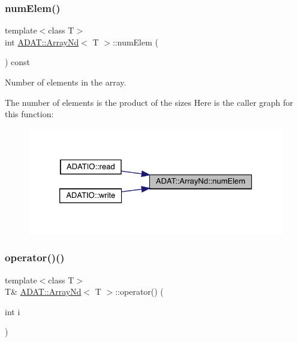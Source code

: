 \subsubsection{\texorpdfstring{numElem()}{numElem()}\hspace{0.1cm}{\footnotesize\ttfamily [2/2]}}
{\footnotesize\ttfamily template$<$class T$>$ \\
int \mbox{\hyperlink{classADAT_1_1ArrayNd}{A\+D\+A\+T\+::\+Array\+Nd}}$<$ T $>$\+::num\+Elem (\begin{DoxyParamCaption}{ }\end{DoxyParamCaption}) const\hspace{0.3cm}{\ttfamily [inline]}}



Number of elements in the array. 

The number of elements is the product of the sizes Here is the caller graph for this function\+:\nopagebreak
\begin{figure}[H]
\begin{center}
\leavevmode
\includegraphics[width=326pt]{d1/db2/classADAT_1_1ArrayNd_a5c33ae0e66b53a2fd86f804f0f4292e9_icgraph}
\end{center}
\end{figure}
\mbox{\label{classADAT_1_1ArrayNd_a927bb95e9323c4f74e0721ee867bcb64}} 
\subsubsection{\texorpdfstring{operator()()}{operator()()}\hspace{0.1cm}{\footnotesize\ttfamily [1/16]}}
{\footnotesize\ttfamily template$<$class T$>$ \\
T\& \mbox{\hyperlink{classADAT_1_1ArrayNd}{A\+D\+A\+T\+::\+Array\+Nd}}$<$ T $>$\+::operator() (\begin{DoxyParamCaption}\item[{int}]{i }\end{DoxyParamCaption})\hspace{0.3cm}{\ttfamily [inline]}}



